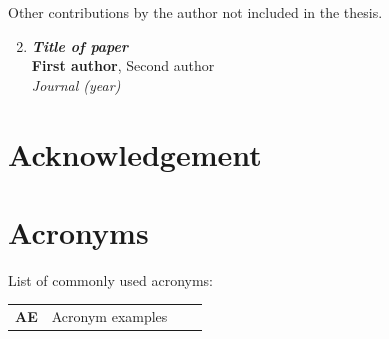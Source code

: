 \documentclass[electronic]{kthesis}
\begin{document}
	Other contributions by the author not included in the thesis.
	\begin{enumerate}[I]
		\setcounter{enumi}{1}
		\item \textbf{\textit{Title of paper}} \\
		\textbf{First author}, Second author \\
		\textit{Journal (year)}
	\end{enumerate}
	\chapter{Acknowledgement}
	\noindent \lipsum[1]
	
	\chapter{Acronyms}
	List of commonly used acronyms: \\
	
	\begin{tabular}{llll}
		\textbf{AE}		&	Acronym examples \\
		
	\end{tabular}
	
	
	\mainmatter %
	\tableofcontents
	
\end{document}
